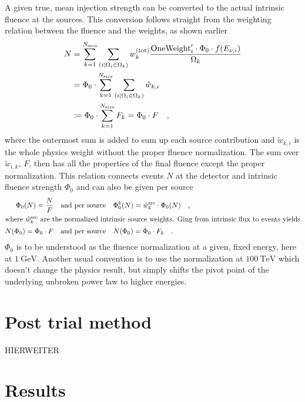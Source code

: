 A given true, mean injection strength can be converted to the actual intrinsic fluence at the sources.
This conversion follows straight from the weighting relation between the fluence and the weights, as shown earlier
\begin{align}
  N &= \sum_{k=1}^{N_\text{srcs}} \sum_{(i|\Omega_i \in \Omega_k)}
    w_k^{(\text{tot})}\frac{\text{OneWeight}'_i\cdot\Phi_0\cdot f(E_{\nu,i})}
                           {\Omega_k} \\
  &= \Phi_0 \cdot
      \sum_{k=1}^{N_\text{srcs}}
      \sum_{(i|\Omega_i \in \Omega_k)} \tilde{w}_{k,i} \\
  &\coloneqq \Phi_0 \cdot \sum_{k=1}^{N_\text{srcs}} F_k = \Phi_0 \cdot F
  \quad\text{,}
\end{align}
where the outermost sum is added to sum up each source contribution and $\tilde{w}_{k,i}$ is the whole physics weight without the proper fluence normalization.
The sum over $\tilde{w}_{i,k}$, $F$, then has all the properties of the final fluence except the proper normalization.
This relation connects events $N$ at the detector and intrinsic fluence strength $\Phi_0$ and can also be given per source
\begin{align}
  \Phi_0(N) = \frac{N}{F}
    &\quad\text{and per source}\quad
    \Phi_0^k(N) = \hat{w}_k^\text{src} \cdot \Phi_0(N)
    \quad\text{,} \\
  \intertext{where $\hat{w}_k^\text{src}$ are the normalized intrinsic source weights. Ging from intrinsic flux to events yields}
  N(\Phi_0) = \Phi_0 \cdot F
    &\quad\text{and per source}\quad
    N(\Phi_0) = \Phi_0 \cdot F_k
  \quad\text{.}
\end{align}
$\Phi_0$ is to be understood as the fluence normalization at a given, fixed energy, here at $\SI{1}{\GeV}$.
Another usual convention is to use the normalization at $\SI{100}{\TeV}$ which doesn't change the physics result, but simply shifts the pivot point of the underlying unbroken power law to higher energies.

\section{Post trial method}
HIERWEITER

\section{Results}

